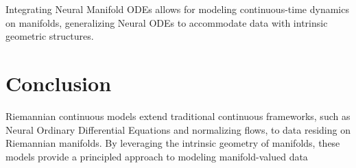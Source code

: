 \documentclass[a4paper,14pt]{article}
\theoremstyle{plain} %
\theoremstyle{definition} %
\theoremstyle{remark} %
\begin{document}
	Integrating Neural Manifold ODEs allows for modeling continuous-time dynamics on manifolds, generalizing Neural ODEs to accommodate data with intrinsic geometric structures.
	
	\section{Conclusion}
	
	Riemannian continuous models extend traditional continuous frameworks, such as Neural Ordinary Differential Equations and normalizing flows, to data residing on Riemannian manifolds. By leveraging the intrinsic geometry of manifolds, these models provide a principled approach to modeling manifold-valued data
	
	\nocite{*}
	\printbibliography
	
\end{document}
